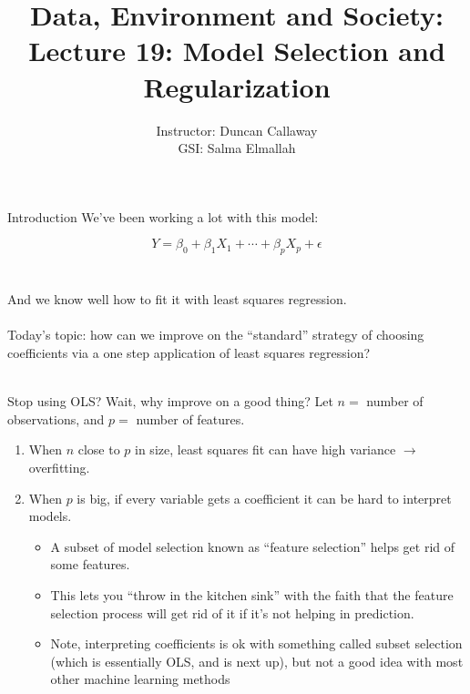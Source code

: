 \documentclass[mathserif, aspectratio=169]{beamer}
\title[Lecture 14] %
{Data, Environment and Society: \\{Lecture 19: Model Selection and Regularization}}
\author[ER131: Data, Environment and Society] 
{Instructor: Duncan Callaway\\
GSI: Salma Elmallah}
\institute[UC Berkeley] %
 {\small{ \bf October 17, 2019}}
\date[October 27, 2019]
\begin{document}
\frame{
  \titlepage
}

\begin{frame}{Introduction}
We've been working a lot with this model:

\begin{equation*}
Y = \beta_0+\beta_1X_1+\cdots+\beta_pX_p+\epsilon
\end{equation*}\\~\\
And we know well how to fit it with least squares regression.\\~\\

Today's topic: how can we improve on the ``standard'' strategy of choosing coefficients via a one step application of least squares regression?\\~\\
\end{frame}

\begin{frame}{Stop using OLS?  Wait, why improve on a good thing?}
Let $n=$ number of observations, and $p=$ number of features.
 \begin{enumerate}
\item When $n$ close to $p$ in size, least squares fit can have high variance $\rightarrow$ overfitting.
\item When $p$ is big, if every variable gets a coefficient it can be hard to interpret models.  
\begin{itemize}
\item A subset of model selection known as ``feature selection'' helps get rid of some features.
\item This lets you ``throw in the kitchen sink'' with the faith that the feature selection process will get rid of it if it's not helping in prediction.
\item Note, interpreting coefficients is ok with something called subset selection (which is essentially OLS, and is next up), but not a good idea with most other machine learning methods
\end{itemize}
\end{enumerate}
\end{frame}
\end{document}
